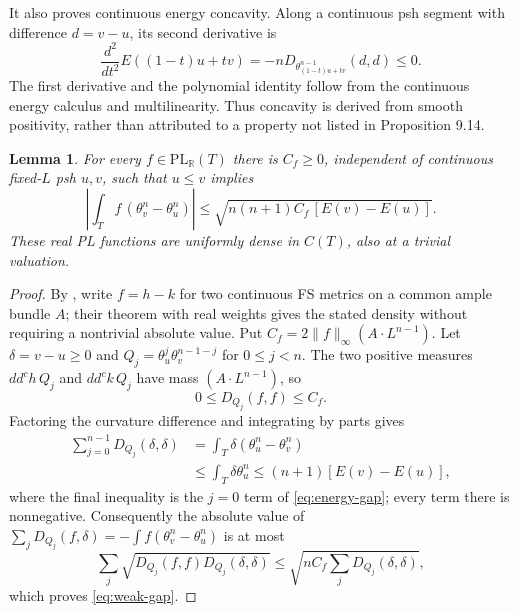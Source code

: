 \documentclass[11pt]{article}
\newtheorem{lemma}[theorem]{Lemma}
\newcommand{\ddc}{dd^c}
\begin{document}
It also proves continuous energy concavity. Along a continuous psh
segment with difference $d=v-u$, its second derivative is
\[
 \frac{d^2}{dt^2}E((1-t)u+tv)
       =-nD_{\theta_{(1-t)u+tv}^{n-1}}(d,d)\leq0.
\]
The first derivative and the polynomial identity follow from the
continuous energy calculus and multilinearity. Thus concavity is
derived from smooth positivity, rather than attributed to a property
not listed in Proposition 9.14.

\begin{lemma}\label{lem:weak-gap}
For every $f\in\mathrm{PL}_{\mathbb R}(T)$ there is $C_f\geq0$,
independent of continuous fixed-$L$ psh $u,v$, such that $u\leq v$
implies
\begin{equation}\label{eq:weak-gap}
 \left|\int_T f\,(\theta_v^n-\theta_u^n)\right|
       \leq\sqrt{n(n+1)C_f\,[E(v)-E(u)]}.
\end{equation}
These real PL functions are uniformly dense in $C(T)$, also at a
trivial valuation.
\end{lemma}
\begin{proof}
By \cite[Lemma 5.17 and Theorem 5.18]{BE}, write $f=h-k$ for two
continuous FS metrics on a common ample bundle $A$; their theorem
with real weights gives the stated density without requiring a
nontrivial absolute value. Put
$C_f=2\|f\|_\infty(A\cdot L^{n-1})$.
Let $\delta=v-u\geq0$ and
$Q_j=\theta_u^j\theta_v^{n-1-j}$ for $0\leq j<n$.
The two positive measures $\ddc h\,Q_j$ and $\ddc k\,Q_j$ have
mass $(A\cdot L^{n-1})$, so
\[
 0\leq D_{Q_j}(f,f)\leq C_f.
\]
Factoring the curvature difference and integrating by parts gives
\[
 \begin{split}
 \sum_{j=0}^{n-1}D_{Q_j}(\delta,\delta)
   &=\int_T\delta(\theta_u^n-\theta_v^n)\\
   &\leq\int_T\delta\theta_u^n
    \leq(n+1)[E(v)-E(u)],
 \end{split}
\]
where the final inequality is the $j=0$ term of
\eqref{eq:energy-gap}; every term there is nonnegative.
Consequently the absolute value of
$\sum_jD_{Q_j}(f,\delta)=-\int f(\theta_v^n-\theta_u^n)$
is at most
\[
 \sum_j\sqrt{D_{Q_j}(f,f)D_{Q_j}(\delta,\delta)}
 \leq\sqrt{nC_f\sum_jD_{Q_j}(\delta,\delta)},
\]
which proves \eqref{eq:weak-gap}.
\end{proof}
\end{document}
